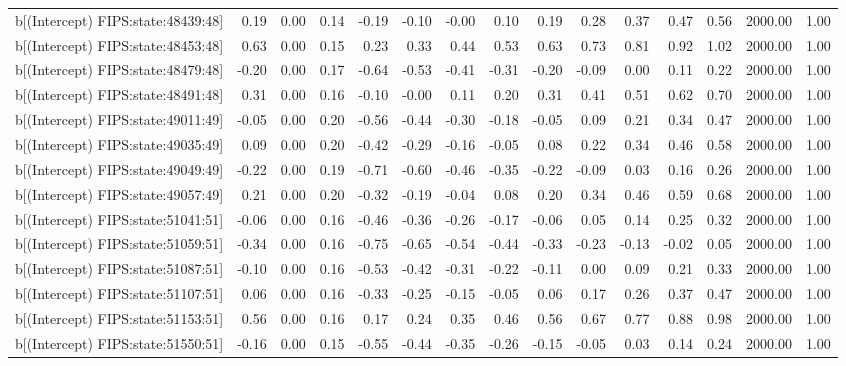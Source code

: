 \begin{table}[ht]
\begin{tabular}{rrrrrrrrrrrrrrr}
  b[(Intercept) FIPS:state:48439:48] & 0.19 & 0.00 & 0.14 & -0.19 & -0.10 & -0.00 & 0.10 & 0.19 & 0.28 & 0.37 & 0.47 & 0.56 & 2000.00 & 1.00 \\ 
  b[(Intercept) FIPS:state:48453:48] & 0.63 & 0.00 & 0.15 & 0.23 & 0.33 & 0.44 & 0.53 & 0.63 & 0.73 & 0.81 & 0.92 & 1.02 & 2000.00 & 1.00 \\ 
  b[(Intercept) FIPS:state:48479:48] & -0.20 & 0.00 & 0.17 & -0.64 & -0.53 & -0.41 & -0.31 & -0.20 & -0.09 & 0.00 & 0.11 & 0.22 & 2000.00 & 1.00 \\ 
  b[(Intercept) FIPS:state:48491:48] & 0.31 & 0.00 & 0.16 & -0.10 & -0.00 & 0.11 & 0.20 & 0.31 & 0.41 & 0.51 & 0.62 & 0.70 & 2000.00 & 1.00 \\ 
  b[(Intercept) FIPS:state:49011:49] & -0.05 & 0.00 & 0.20 & -0.56 & -0.44 & -0.30 & -0.18 & -0.05 & 0.09 & 0.21 & 0.34 & 0.47 & 2000.00 & 1.00 \\ 
  b[(Intercept) FIPS:state:49035:49] & 0.09 & 0.00 & 0.20 & -0.42 & -0.29 & -0.16 & -0.05 & 0.08 & 0.22 & 0.34 & 0.46 & 0.58 & 2000.00 & 1.00 \\ 
  b[(Intercept) FIPS:state:49049:49] & -0.22 & 0.00 & 0.19 & -0.71 & -0.60 & -0.46 & -0.35 & -0.22 & -0.09 & 0.03 & 0.16 & 0.26 & 2000.00 & 1.00 \\ 
  b[(Intercept) FIPS:state:49057:49] & 0.21 & 0.00 & 0.20 & -0.32 & -0.19 & -0.04 & 0.08 & 0.20 & 0.34 & 0.46 & 0.59 & 0.68 & 2000.00 & 1.00 \\ 
  b[(Intercept) FIPS:state:51041:51] & -0.06 & 0.00 & 0.16 & -0.46 & -0.36 & -0.26 & -0.17 & -0.06 & 0.05 & 0.14 & 0.25 & 0.32 & 2000.00 & 1.00 \\ 
  b[(Intercept) FIPS:state:51059:51] & -0.34 & 0.00 & 0.16 & -0.75 & -0.65 & -0.54 & -0.44 & -0.33 & -0.23 & -0.13 & -0.02 & 0.05 & 2000.00 & 1.00 \\ 
  b[(Intercept) FIPS:state:51087:51] & -0.10 & 0.00 & 0.16 & -0.53 & -0.42 & -0.31 & -0.22 & -0.11 & 0.00 & 0.09 & 0.21 & 0.33 & 2000.00 & 1.00 \\ 
  b[(Intercept) FIPS:state:51107:51] & 0.06 & 0.00 & 0.16 & -0.33 & -0.25 & -0.15 & -0.05 & 0.06 & 0.17 & 0.26 & 0.37 & 0.47 & 2000.00 & 1.00 \\ 
  b[(Intercept) FIPS:state:51153:51] & 0.56 & 0.00 & 0.16 & 0.17 & 0.24 & 0.35 & 0.46 & 0.56 & 0.67 & 0.77 & 0.88 & 0.98 & 2000.00 & 1.00 \\ 
  b[(Intercept) FIPS:state:51550:51] & -0.16 & 0.00 & 0.15 & -0.55 & -0.44 & -0.35 & -0.26 & -0.15 & -0.05 & 0.03 & 0.14 & 0.24 & 2000.00 & 1.00 \\ 

\end{tabular}
\end{table}

